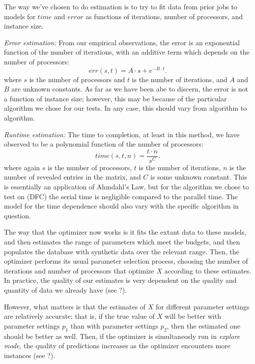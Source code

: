 The way we've chosen to do estimation is to try to fit data from
prior jobs to models for $time$ and $error$ as functions of iterations, 
number of processors, and instance size. 


{\em Error estimation:} From our empirical observations, the error is an exponential function of
the number of iterations, with an additive term which depends on the number
of processors:
\[
err(s,t) = A\cdot s + e^{-B\cdot t}.
\]
where $s$ is the number of processors and $t$ is the number of iterations, 
and $A$ and $B$ are unknown constants. As far as we have been abe to 
discern, the error is not a function of instance size; however, this
may be because of the particular algorithm we chose for our tests. In 
any case, this should vary from algorithm to algorithm.

{\em Runtime estimation:} The time to completion, at least 
in this method, we have observed to be a polynomial function of the 
number of processors:
\[
time(s,t,n) = \frac{t\cdot n}{s^{C}}. %
\]
where again $s$ is the number of processors, $t$ is the number of 
iterations, $n$ is the number of revealed entries in the matrix, 
and $C$ is some unknown constant. This is essentially an application of 
Ahmdahl's Law, but for the algorithm we chose to test on (DFC) the
serial time is negligible compared to the parallel time. The model
for the time dependence should also vary with the specific algorithm
in question. 

The way that the optimizer now works is it fits the extant data to
these models, and then estimates the range of parameters which meet the
budgets, and then populates the database with synthetic data 
over the relevant range. Then, the optimizer performs its usual
parameter selection process, choosing the  number of iterations 
and number of processors that optimize $X$ according to these estimates. 
In practice, the quality of our estimates is very dependent on the 
quality and quantity of data we already have 
(see ?). %

However, what matters is that the estimates of $X$ for different 
parameter settings are relatively accurate; that is, if the true value 
of $X$ will be better with parameter settings $p_1$ than with parameter
settings $p_2$, then the estimated one should be better as well. Then, 
if the optimizer is simultaneosly run in {\em explore mode}, the quality
of predictions increases as the optimizer encounters more 
instances (see ?). %

